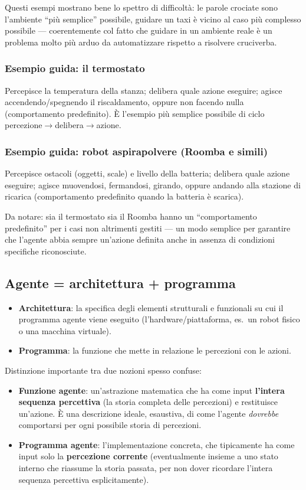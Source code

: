 \documentclass[11pt,a4paper]{report}
\begin{document}
Questi esempi mostrano bene lo spettro di difficoltà: le parole crociate sono l'ambiente ``più semplice'' possibile, guidare un taxi è vicino al caso più complesso possibile --- coerentemente col fatto che guidare in un ambiente reale è un problema molto più arduo da automatizzare rispetto a risolvere cruciverba.

\subsubsection*{Esempio guida: il termostato}

Percepisce la temperatura della stanza; delibera quale azione eseguire; agisce accendendo/spegnendo il riscaldamento, oppure non facendo nulla (comportamento predefinito). È l'esempio più semplice possibile di ciclo percezione$\to$delibera$\to$azione.

\subsubsection*{Esempio guida: robot aspirapolvere (Roomba e simili)}

Percepisce ostacoli (oggetti, scale) e livello della batteria; delibera quale azione eseguire; agisce muovendosi, fermandosi, girando, oppure andando alla stazione di ricarica (comportamento predefinito quando la batteria è scarica).

Da notare: sia il termostato sia il Roomba hanno un ``comportamento predefinito'' per i casi non altrimenti gestiti --- un modo semplice per garantire che l'agente abbia sempre un'azione definita anche in assenza di condizioni specifiche riconosciute.

\subsection{Agente = architettura + programma}

\begin{itemize}
  \item \textbf{Architettura}: la specifica degli elementi strutturali e funzionali su cui il programma agente viene eseguito (l'hardware/piattaforma, es.\ un robot fisico o una macchina virtuale).
  \item \textbf{Programma}: la funzione che mette in relazione le percezioni con le azioni.
\end{itemize}

Distinzione importante tra due nozioni spesso confuse:
\begin{itemize}
  \item \textbf{Funzione agente}: un'astrazione matematica che ha come input \textbf{l'intera sequenza percettiva} (la storia completa delle percezioni) e restituisce un'azione. È una descrizione ideale, esaustiva, di come l'agente \emph{dovrebbe} comportarsi per ogni possibile storia di percezioni.
  \item \textbf{Programma agente}: l'implementazione concreta, che tipicamente ha come input solo la \textbf{percezione corrente} (eventualmente insieme a uno stato interno che riassume la storia passata, per non dover ricordare l'intera sequenza percettiva esplicitamente).
\end{itemize}
\end{document}
